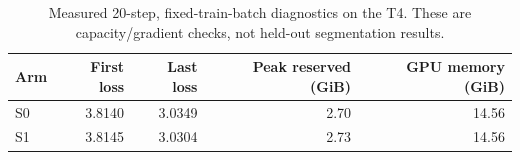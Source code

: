 \begin{table}[H]
\centering\small
\caption{Measured 20-step, fixed-train-batch diagnostics on the T4. These are capacity/gradient checks, not held-out segmentation results.}\label{tab:pilots}
\begin{tabular}{lrrrr}\toprule
Arm & First loss & Last loss & Peak reserved (GiB) & GPU memory (GiB) \\ \midrule
S0 & 3.8140 & 3.0349 & 2.70 & 14.56 \\
S1 & 3.8145 & 3.0304 & 2.73 & 14.56 \\
\bottomrule\end{tabular}
\end{table}

